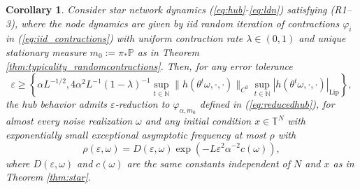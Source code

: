 \documentclass[a4paper]{article}
\theoremstyle{plain}
\newtheorem{corollary}[theorem]{Corollary}
\theoremstyle{definition}
\newcommand{\PP}{\mathbb{P}}
\newcommand{\T}{\mathbb{T}}
\newcommand{\N}{\mathbb{N}}
\begin{document}
\begin{corollary}\label{cor:star_contractions}
	Consider star network dynamics (\ref{eq:hub}-\ref{eq:ldn}) satisfying (R1--3), where the node dynamics are given by iid random iteration of contractions $\varphi_i$ in (\ref{eq:iid_contractions}) with uniform contraction rate $\lambda\in(0,1)$ and unique stationary measure $m_0:=\pi_*\PP$ as in Theorem \ref{thm:typicality_randomcontractions}.
	Then, for any error tolerance 
	$$\varepsilon\geq \left\{\alpha L^{-1/2},4\alpha^2 L^{-1} (1-\lambda)^{-1}\sup_{t\in\N} \|h(\theta^t\omega,\cdot,\cdot)\|_{C^0} \sup_{t\in\N } |h(\theta^t\omega,\cdot,\cdot)|_{\mathrm{Lip}}\right\},$$
	the hub behavior admits $\varepsilon$-reduction to $\varphi_{\alpha,m_0}$ defined in (\ref{eq:reducedhub}), for almost every noise realization $\omega$ and any initial condition $x\in\T^N$ with exponentially small exceptional asymptotic frequency at most $\rho$ with
	$$\rho(\varepsilon,\omega)= D(\varepsilon,\omega)\exp(-L\varepsilon^2 \alpha^{-2}c(\omega)),$$
	where $D(\varepsilon,\omega)$ and $c(\omega)$ are the same constants independent of $N$ and $x$ as in Theorem \ref{thm:star}.
\end{corollary}
\end{document}
